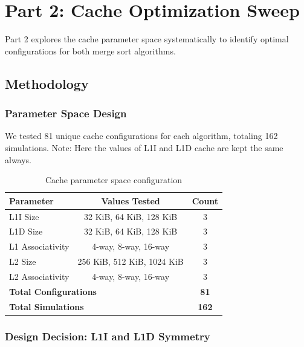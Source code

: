 \documentclass[12pt,a4paper]{article}
\begin{document}
\newpage
\section{Part 2: Cache Optimization Sweep}

Part 2 explores the cache parameter space systematically to identify optimal configurations for both merge sort algorithms.

\subsection{Methodology}

\subsubsection{Parameter Space Design}

We tested 81 unique cache configurations for each algorithm, totaling 162 simulations.
Note: Here the values of L1I and L1D cache are kept the same always.

\begin{table}[H]
\centering
\begin{tabular}{lcc}
\toprule
\textbf{Parameter} & \textbf{Values Tested} & \textbf{Count} \\
\midrule
L1I Size & 32 KiB, 64 KiB, 128 KiB & 3 \\
L1D Size & 32 KiB, 64 KiB, 128 KiB & 3 \\
L1 Associativity & 4-way, 8-way, 16-way & 3 \\
L2 Size & 256 KiB, 512 KiB, 1024 KiB & 3 \\
L2 Associativity & 4-way, 8-way, 16-way & 3 \\
\midrule
\multicolumn{2}{l}{\textbf{Total Configurations}} & \textbf{81} \\
\multicolumn{2}{l}{\textbf{Total Simulations}} & \textbf{162} \\
\bottomrule
\end{tabular}
\caption{Cache parameter space configuration}
\label{tab:param_space}
\end{table}

\subsubsection{Design Decision: L1I and L1D Symmetry}
\end{document}
